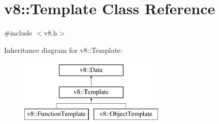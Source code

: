 \hypertarget{classv8_1_1Template}{}\section{v8\+:\+:Template Class Reference}
\label{classv8_1_1Template}


{\ttfamily \#include $<$v8.\+h$>$}

Inheritance diagram for v8\+:\+:Template\+:\begin{figure}[H]
\begin{center}
\leavevmode
\includegraphics[height=3.000000cm]{classv8_1_1Template}
\end{center}
\end{figure}
